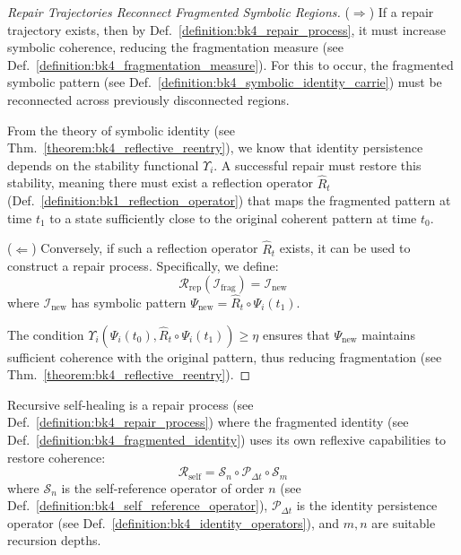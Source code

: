 \begin{proof}[Repair Trajectories Reconnect Fragmented Symbolic Regions]
\label{proof:bk4_repair_reconnects_fragmentation}
($\Rightarrow$) If a repair trajectory exists, then by Def.~\ref{definition:bk4_repair_process}, it must increase symbolic coherence, reducing the fragmentation measure (see Def.~\ref{definition:bk4_fragmentation_measure}). For this to occur, the fragmented symbolic pattern (see Def.~\ref{definition:bk4_symbolic_identity_carrie}) must be reconnected across previously disconnected regions.

From the theory of symbolic identity (see Thm.~\ref{theorem:bk4_reflective_reentry}), we know that identity persistence depends on the stability functional $\Upsilon_i$. A successful repair must restore this stability, meaning there must exist a reflection operator $\widehat{R}_t$ (Def.~\ref{definition:bk1_reflection_operator}) that maps the fragmented pattern at time $t_1$ to a state sufficiently close to the original coherent pattern at time $t_0$.

($\Leftarrow$) Conversely, if such a reflection operator $\widehat{R}_t$ exists, it can be used to construct a repair process. Specifically, we define:
\begin{equation}
    \mathcal{R}_{\text{rep}}(\mathcal{I}_{\text{frag}}) = \mathcal{I}_{\text{new}}
\end{equation}
where $\mathcal{I}_{\text{new}}$ has symbolic pattern $\Psi_{\text{new}} = \widehat{R}_t \circ \Psi_i(t_1)$.

The condition $\Upsilon_i(\Psi_i(t_0), \widehat{R}_t \circ \Psi_i(t_1)) \geq \eta$ ensures that $\Psi_{\text{new}}$ maintains sufficient coherence with the original pattern, thus reducing fragmentation (see Thm.~\ref{theorem:bk4_reflective_reentry}).
\end{proof}
\begin{definition} \label{definition:bk4_recursive_self_healing}
Recursive self-healing is a repair process (see Def.~\ref{definition:bk4_repair_process}) where the fragmented identity (see Def.~\ref{definition:bk4_fragmented_identity}) uses its own reflexive capabilities to restore coherence:
\begin{equation}
    \mathcal{R}_{\text{self}} = \mathcal{S}_n \circ \mathcal{P}_{\Delta t} \circ \mathcal{S}_m
\end{equation}
where $\mathcal{S}_n$ is the self-reference operator of order $n$ (see Def.~\ref{definition:bk4_self_reference_operator}), $\mathcal{P}_{\Delta t}$ is the identity persistence operator (see Def.~\ref{definition:bk4_identity_operators}), and $m, n$ are suitable recursion depths.
\end{definition}
